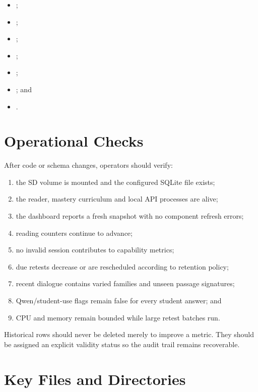 \documentclass[11pt,a4paper]{article}
\begin{document}
\begin{itemize}
  \item {};
  \item {};
  \item {};
  \item {};
  \item {};
  \item {}; and
  \item {}.
\end{itemize}

\section{Operational Checks}

After code or schema changes, operators should verify:

\begin{enumerate}
  \item the SD volume is mounted and the configured SQLite file exists;
  \item the reader, mastery curriculum and local API processes are alive;
  \item the dashboard reports a fresh snapshot with no component refresh errors;
  \item reading counters continue to advance;
  \item no invalid session contributes to capability metrics;
  \item due retests decrease or are rescheduled according to retention policy;
  \item recent dialogue contains varied families and unseen passage signatures;
  \item Qwen/student-use flags remain false for every student answer; and
  \item CPU and memory remain bounded while large retest batches run.
\end{enumerate}

Historical rows should never be deleted merely to improve a metric.  They should be assigned an
explicit validity status so the audit trail remains recoverable.

\section{Key Files and Directories}
\end{document}
